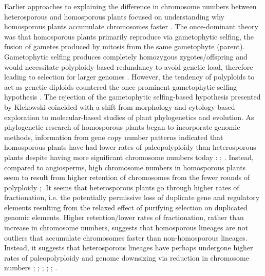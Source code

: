 Earlier approaches to explaining the difference in chromosome numbers between heterosporous and homosporous plants focused on understanding why homosporous plants accumulate chromosomes faster \cite{Haufler2014-ov}. The once-dominant theory was that homosporous plants primarily reproduce via gametophytic selfing, the fusion of gametes produced by mitosis from the same gametophyte (parent). Gametophytic selfing produces completely homozygous zygotes/offspring and would necessitate polyploidy-based redundancy to avoid genetic load, therefore leading to selection for larger genomes \cite{Hickok1978-bw}. However, the tendency of polyploids to act as genetic diploids countered the once prominent gametophytic selfing hypothesis \cite{Haufler1986-qx}. The rejection of the gametophytic selfing-based hypothesis presented by Klekowski \cite{Haufler2014-ov} coincided with a shift from morphology and cytology based exploration to molecular-based studies of plant phylogenetics and evolution.
As phylogenetic research of homosporous plants began to incorporate genomic methods, information from gene copy number patterns indicated that homosporous plants have had lower rates of paleopolyploidy than heterosporous plants despite having more significant chromosome numbers today \cite{Clark2016-de}: \cite{Carta2020-gw}; \cite{Mayrose2021-rw}. Instead, compared to angiosperms, high chromosome numbers in homosporous plants seem to result from higher retention of chromosomes from the fewer rounds of polyploidy \cite{Barker2009-oi}; \cite{Marchant2021-kp}.It seems that heterosporous plants go through higher rates of fractionation, i.e. the potentially permissive loss of duplicate gene and regulatory elements resulting from the relaxed effect of purifying selection on duplicated genomic elements. Higher retention/lower rates of fractionation, rather than increase in chromosome numbers, suggests that homosporous lineages are not outliers that accumulate chromosomes faster than non-homosporous lineages. Instead, it suggests that heterosporous lineages have perhaps undergone higher rates of paleopolyploidy and genome downsizing via reduction in chromosome numbers \cite{Barker2009-oi}; \cite{Clark2016-de}; \cite{Li2021-rk}; \cite{Liu2019-eb}; \cite{Wang2021-du}; \cite{Carins_Murphy2017-bv}.
